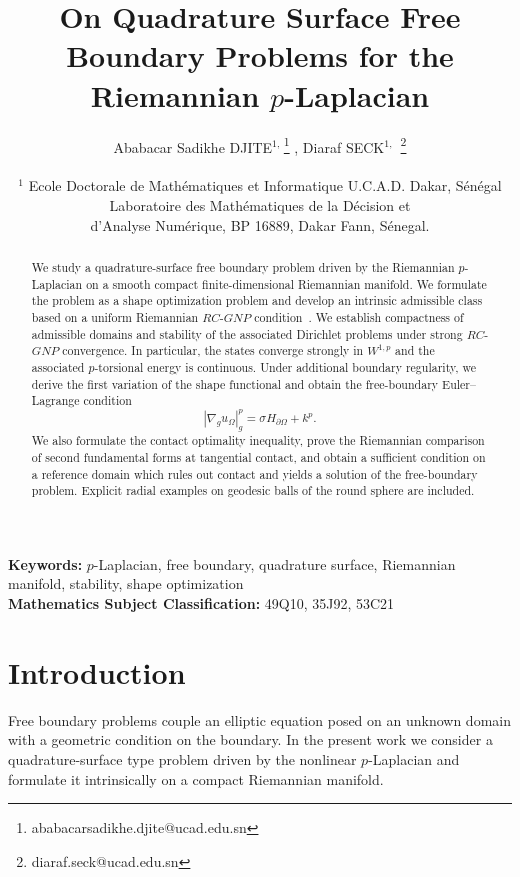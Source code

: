 \documentclass{article}
\title{On Quadrature Surface Free Boundary Problems for the Riemannian $p$-Laplacian}
\author{Ababacar Sadikhe DJITE$^{1,\,}$\footnote{ababacarsadikhe.djite@ucad.edu.sn} ,  Diaraf SECK$^{1,\,}$ \footnote{diaraf.seck@ucad.edu.sn}\\\\
$^{1}$ Ecole Doctorale de Math\'ematiques et Informatique U.C.A.D. Dakar,  S\'en\'egal\\
Laboratoire des Math\'ematiques de la D\'ecision et \\
d'Analyse Num\'erique, BP 16889, Dakar Fann, S\'enegal.}
\begin{document}
\maketitle

\begin{abstract}
We study a quadrature-surface free boundary problem driven by the
Riemannian $p$-Laplacian on a smooth compact finite-dimensional
Riemannian manifold. We formulate the problem as a shape optimization
problem and develop an intrinsic admissible class based on a uniform
Riemannian $RC$-$GNP$ condition~\cite{DS3}. We establish compactness of admissible
domains and stability of the associated Dirichlet problems under strong
$RC$-$GNP$ convergence. In particular, the states converge strongly in
$W^{1,p}$ and the associated $p$-torsional energy is continuous.
Under additional boundary regularity, we derive the first variation of
the shape functional and obtain the free-boundary Euler--Lagrange
condition
\[
|\nabla_g u_\Omega|_g^p=\sigma H_{\partial\Omega}+k^p.
\]
We also formulate the contact optimality inequality, prove the
Riemannian comparison of second fundamental forms at tangential contact,
and obtain a sufficient condition on a reference domain which rules out
contact and yields a solution of the free-boundary problem. Explicit
radial examples on geodesic balls of the round sphere are included.
\end{abstract}

{\bf Keywords:} $p$-Laplacian, free boundary, quadrature surface,
Riemannian manifold, stability, shape optimization\\
{\bf Mathematics Subject Classification:} 49Q10, 35J92, 53C21%

\section{Introduction}

Free boundary problems couple an elliptic equation posed on an unknown
domain with a geometric condition on the boundary. In the present work
we consider a quadrature-surface type problem driven by the nonlinear
$p$-Laplacian and formulate it intrinsically on a compact Riemannian
manifold.
\end{document}
